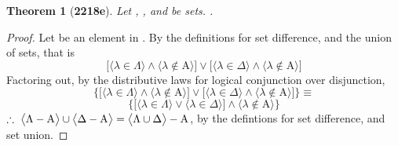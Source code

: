 \documentclass[preview]{standalone}
\newtheorem*{theorem*}{Theorem}
\begin{document}
\begin{theorem*}[\textbf{2218e}] \color{black}
    Let , \bm{$\Lambda$}, and \bm{$\Delta$} be sets. 
    .
\end{theorem*}
\begin{proof} \color{black}
    Let \bm{$\lambda$} be an element in 
    .
    By the definitions for set difference, and the union of sets, that is
    \begin{equation*}
        \bigg[
            \Big \langle \lambda \in \Lambda \Big \rangle
                \land
            \Big \langle \lambda \notin \mathrm{A} \Big \rangle
        \bigg]
            \lor
        \bigg[
            \Big \langle \lambda \in \Delta \Big \rangle
                \land
            \Big \langle \lambda \notin \mathrm{A} \Big \rangle
        \bigg]
    \end{equation*}
    Factoring  out, 
    by the distributive laws for logical conjunction over disjunction,
    \begin{equation*}
        \Bigg\{
            \bigg[
                \Big \langle \lambda \in \Lambda \Big \rangle
                    \land
                \Big \langle \lambda \notin \mathrm{A} \Big \rangle
            \bigg]
                \lor
            \bigg[
                \Big \langle \lambda \in \Delta \Big \rangle
                    \land
                \Big \langle \lambda \notin \mathrm{A} \Big \rangle
            \bigg]
        \Bigg\}
            \equiv
    \end{equation*}
    \begin{equation*}
        \Bigg\{
            \bigg[
                \Big \langle \lambda \in \Lambda \Big \rangle
                    \lor
                \Big \langle \lambda \in \Delta \Big \rangle
            \bigg]
                \land
            \Big \langle \lambda \notin \mathrm{A} \Big \rangle
        \Bigg\}
    \end{equation*}
    $\therefore \text{\space} \relax{
    \big \langle \Lambda - \mathrm{A} \big \rangle 
        \cup 
    \big \langle \Delta - \mathrm{A} \big \rangle 
        = 
    \big \langle \Lambda \cup \Delta \big \rangle - \mathrm{A}
    }$,
    by the defintions for set difference, and set union.
\color{lightgray} \end{proof}
\end{document}
